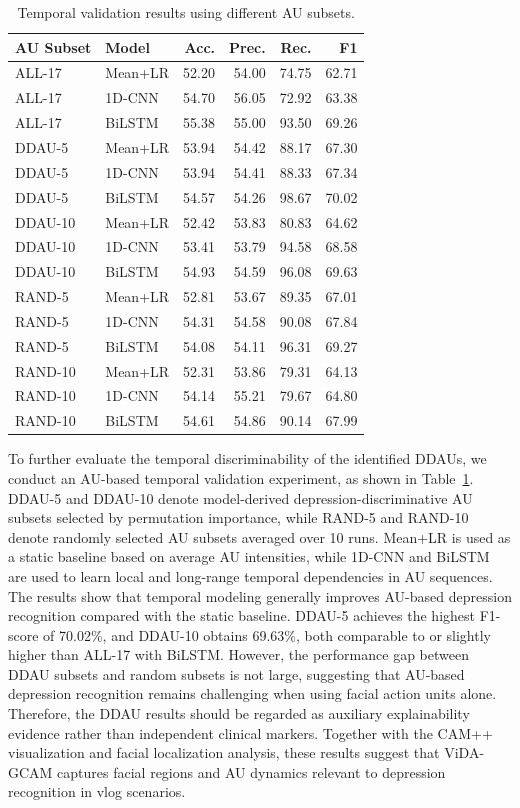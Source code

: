 \documentclass[a4paper,fleqn]{cas-dc}
\begin{document}
\begin{table}[t]
\centering
\caption{Temporal validation results using different AU subsets.}
\label{tab:au_validation}
\begin{tabular}{llrrrr}
\hline
AU Subset & Model & Acc. & Prec. & Rec. & F1 \\
\hline
ALL-17 & Mean+LR & 52.20 & 54.00 & 74.75 & 62.71 \\
ALL-17 & 1D-CNN & 54.70 & 56.05 & 72.92 & 63.38 \\
ALL-17 & BiLSTM & 55.38 & 55.00 & 93.50 & 69.26 \\
\hline
DDAU-5 & Mean+LR & 53.94 & 54.42 & 88.17 & 67.30 \\
DDAU-5 & 1D-CNN & 53.94 & 54.41 & 88.33 & 67.34 \\
DDAU-5 & BiLSTM & 54.57 & 54.26 & 98.67 & 70.02 \\
\hline
DDAU-10 & Mean+LR & 52.42 & 53.83 & 80.83 & 64.62 \\
DDAU-10 & 1D-CNN & 53.41 & 53.79 & 94.58 & 68.58 \\
DDAU-10 & BiLSTM & 54.93 & 54.59 & 96.08 & 69.63 \\
\hline
RAND-5 & Mean+LR & 52.81 & 53.67 & 89.35 & 67.01 \\
RAND-5 & 1D-CNN & 54.31 & 54.58 & 90.08 & 67.84 \\
RAND-5 & BiLSTM & 54.08 & 54.11 & 96.31 & 69.27 \\
\hline
RAND-10 & Mean+LR & 52.31 & 53.86 & 79.31 & 64.13 \\
RAND-10 & 1D-CNN & 54.14 & 55.21 & 79.67 & 64.80 \\
RAND-10 & BiLSTM & 54.61 & 54.86 & 90.14 & 67.99 \\
\hline
\end{tabular}
\end{table}

To further evaluate the temporal discriminability of the identified DDAUs, we conduct an AU-based temporal validation experiment, as shown in Table~\ref{tab:au_validation}. DDAU-5 and DDAU-10 denote model-derived depression-discriminative AU subsets selected by permutation importance, while RAND-5 and RAND-10 denote randomly selected AU subsets averaged over 10 runs. Mean+LR is used as a static baseline based on average AU intensities, while 1D-CNN and BiLSTM are used to learn local and long-range temporal dependencies in AU sequences. The results show that temporal modeling generally improves AU-based depression recognition compared with the static baseline. DDAU-5 achieves the highest F1-score of 70.02\%, and DDAU-10 obtains 69.63\%, both comparable to or slightly higher than ALL-17 with BiLSTM. However, the performance gap between DDAU subsets and random subsets is not large, suggesting that AU-based depression recognition remains challenging when using facial action units alone. Therefore, the DDAU results should be regarded as auxiliary explainability evidence rather than independent clinical markers. Together with the CAM++ visualization and facial localization analysis, these results suggest that ViDA-GCAM captures facial regions and AU dynamics relevant to depression recognition in vlog scenarios.
\end{document}
